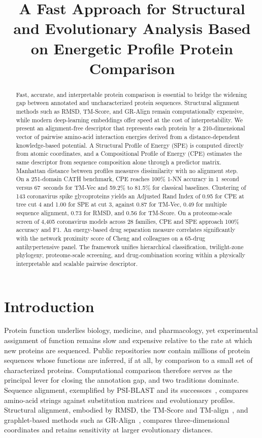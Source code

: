 \documentclass[11pt]{article}
\title{A Fast Approach for Structural and Evolutionary Analysis Based on Energetic Profile Protein Comparison}
\date{}
\begin{document}
\maketitle

\begin{abstract}
Fast, accurate, and interpretable protein comparison is essential to bridge the
widening gap between annotated and uncharacterized protein sequences. Structural
alignment methods such as RMSD, TM-Score, and GR-Align remain computationally
expensive, while modern deep-learning embeddings offer speed at the cost of
interpretability. We present an alignment-free descriptor that represents each
protein by a 210-dimensional vector of pairwise amino-acid interaction energies
derived from a distance-dependent knowledge-based potential. A Structural Profile
of Energy (SPE) is computed directly from atomic coordinates, and a Compositional
Profile of Energy (CPE) estimates the same descriptor from sequence composition
alone through a predictor matrix. Manhattan distance between profiles measures
dissimilarity with no alignment step. On a 251-domain CATH benchmark, CPE
reaches 100\% 1-NN accuracy in 1~second versus 67~seconds for TM-Vec and 59.2\%
to 81.5\% for classical baselines. Clustering of 143 coronavirus spike
glycoproteins yields an Adjusted Rand Index of 0.95 for CPE at tree cut 4 and 1.00
for SPE at cut 3, against 0.87 for TM-Vec, 0.49 for multiple sequence alignment,
0.73 for RMSD, and 0.56 for TM-Score. On a proteome-scale screen of 4{,}405
coronavirus models across 28 families, CPE and SPE approach 100\% accuracy and
F1. An energy-based drug separation measure correlates significantly with the
network proximity score of Cheng and colleagues on a 65-drug antihypertensive
panel. The framework unifies hierarchical classification, twilight-zone
phylogeny, proteome-scale screening, and drug-combination scoring within a
physically interpretable and scalable pairwise descriptor.
\end{abstract}

\section{Introduction}

Protein function underlies biology, medicine, and pharmacology, yet
experimental assignment of function remains slow and expensive relative to the
rate at which new proteins are sequenced. Public repositories now contain
millions of protein sequences whose functions are inferred, if at all, by
comparison to a small set of characterized proteins. Computational comparison
therefore serves as the principal lever for closing the annotation gap, and
two traditions dominate. Sequence alignment, exemplified by PSI-BLAST and its
successors~\citep{boratyn2012delta}, compares amino-acid strings against
substitution matrices and evolutionary profiles. Structural alignment,
embodied by RMSD, the TM-Score and TM-align~\citep{zhang2005tmalign}, and
graphlet-based methods such as GR-Align~\citep{maloddognin2014gralign},
compares three-dimensional coordinates and retains sensitivity at larger
evolutionary distances.
\end{document}
